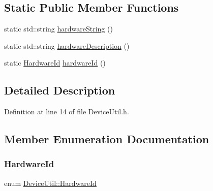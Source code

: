 \subsection*{Static Public Member Functions}
\begin{DoxyCompactItemize}
\item 
static std\+::string \mbox{\hyperlink{class_device_util_a169613511f0399d3e0d1b3d8674808ba}{hardware\+String}} ()
\item 
static std\+::string \mbox{\hyperlink{class_device_util_a0b41896ef1ac3277c1126341bee50d26}{hardware\+Description}} ()
\item 
static \mbox{\hyperlink{class_device_util_a45e0ab9d49e3a0583798709c4613d9b6}{Hardware\+Id}} \mbox{\hyperlink{class_device_util_aeacce8246f59676945b5f1914a08fb4a}{hardware\+Id}} ()
\end{DoxyCompactItemize}


\subsection{Detailed Description}


Definition at line 14 of file Device\+Util.\+h.



\subsection{Member Enumeration Documentation}
\mbox{\label{class_device_util_a45e0ab9d49e3a0583798709c4613d9b6}} 
\subsubsection{\texorpdfstring{Hardware\+Id}{HardwareId}}
{\footnotesize\ttfamily enum \mbox{\hyperlink{class_device_util_a45e0ab9d49e3a0583798709c4613d9b6}{Device\+Util\+::\+Hardware\+Id}}}

